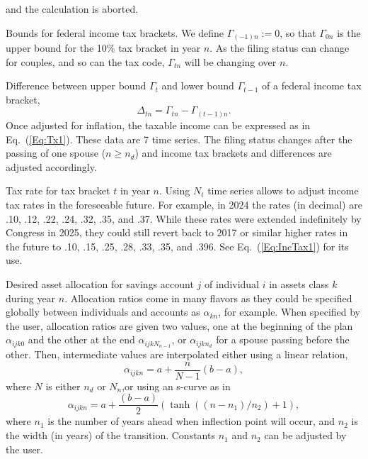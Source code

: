\documentclass{report}[fleqn,12pt]
\begin{document}
\begin{description}[leftmargin=4em,style=multiline]
        and the calculation is aborted.
\item [$\Gamma_{tn}$]
	Bounds for federal income tax brackets. We define $\Gamma_{(-1)n} := 0$, so that
	$\Gamma_{0n}$ is the upper bound for the 10\% tax bracket in year $n$. As the filing status
	can change for couples, and so can the tax code, $\Gamma_{tn}$ will be changing over $n$.
\item [$\Delta_{tn}$]
	Difference between upper bound $\Gamma_t$ and lower bound $\Gamma_{t-1}$
	of a federal income tax bracket,
	\begin{equation}
		\Delta_{tn} = \Gamma_{tn} - \Gamma_{(t-1)n}.
	\end{equation}
	Once adjusted for inflation,
	the taxable income can be expressed as in Eq.~(\ref{Eq:Tx1}). These data are 7 time series.
	The filing status changes after the passing of one spouse ($n \ge n_d$) and income tax
	brackets and differences are adjusted accordingly.
\item [$\theta_{tn}$]
	Tax rate for tax bracket $t$ in year $n$. Using $N_t$ time series allows to adjust income
	tax rates in the foreseeable future.
	For example, in 2024 the rates (in decimal) are .10, .12, .22, .24, .32, .35, and .37.
        While these rates were extended indefinitely by Congress in 2025, they could still
	revert back to 2017 or similar higher rates in the future to
	.10, .15, .25, .28, .33, .35, and .396. See Eq.~(\ref{Eq:IncTax1}) for its use.
\item [$\alpha_{ijkn}$]
	Desired asset allocation for savings account $j$ of individual $i$ in
	assets class $k$ during year $n$.
	Allocation ratios come in many flavors as they could be specified globally between
	individuals and accounts as $\alpha_{kn}$, for example.
	When specified by the user, allocation ratios are given two values, one at the
	beginning of the plan $\alpha_{ijk0}$ and the other at the end
	$\alpha_{ijkN_{n-1}}$, or $\alpha_{ijkn_d}$ for a spouse passing before the other.
        Then, intermediate values are interpolated either using
	a linear relation,
\begin{equation}
	\alpha_{ijkn} = a + \frac{n}{N - 1} (b - a),
\end{equation}
where $N$ is either $n_d$ or $N_n$,or using an s-curve as in
\begin{equation}
	\alpha_{ijkn} = a + \frac{(b - a)}{2}
	(\tanh((n-n_1)/n_2) + 1),
\end{equation}
	where $n_1$ is the number of years ahead when inflection point will occur, and $n_2$ is the
	width (in years) of the transition. Constants $n_1$ and $n_2$ can be adjusted by the user.

\end{description}
\end{document}
